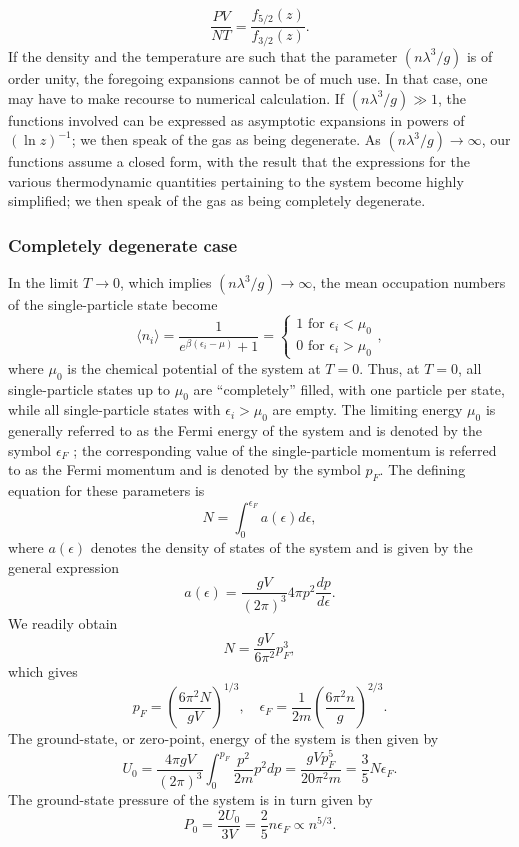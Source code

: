 \[\frac{PV}{NT} = \frac{f_{5/2}(z)}{f_{3/2}(z)}.\]
If the density and the temperature are such that the parameter $(n\lambda^3/g)$ is of order unity, the foregoing expansions cannot be of much use. In that case, one may have to make recourse to numerical calculation.
If $(n\lambda^3/g) \gg 1$, the functions involved can be expressed as asymptotic expansions in powers of $(\ln z)^{-1}$; we then speak of the gas as being degenerate.
As $(n\lambda^3/g) \to \infty$, our functions assume a closed form, with the result that the expressions for the various thermodynamic quantities pertaining to the system become highly simplified; we then speak of the gas as being completely degenerate.

\subsubsection{Completely degenerate case}
In the limit $T \to 0$, which implies $(n\lambda^3/g) \to \infty$, the mean occupation numbers of the single-particle state become
\[\langle n_i \rangle = \frac{1}{e^{\beta(\epsilon_i - \mu)} + 1} = \begin{cases}1 \mbox{ for } \epsilon_i < \mu_0 \\   0 \mbox{ for } \epsilon_i > \mu_0 \end{cases},\]
where $\mu_0$ is the chemical potential of the system at $T = 0$.
Thus, at $T = 0$, all single-particle states up to $\mu_0$ are ``completely'' filled, with one particle per state, while all single-particle states with $\epsilon_i > \mu_0$ are empty. 
The limiting energy $\mu_0$ is generally referred to as the Fermi energy of the system and is denoted by the symbol $\epsilon_F$ ; the corresponding value of the single-particle momentum is referred to as the Fermi momentum and is denoted by the symbol $p_F$. The defining equation for these parameters is
\[N = \int_0^{\epsilon_F} a(\epsilon)d\epsilon,\]
where $a(\epsilon)$ denotes the density of states of the system and is given by the general expression
\[a(\epsilon) = \frac{gV}{(2\pi)^3} 4\pi p^2 \frac{dp}{d\epsilon}.\]
We readily obtain
\[N = \frac{gV}{6\pi^2} p_F^3,\]
which gives
\[p_F = \left( \frac{6\pi^2N}{gV} \right)^{1/3} , \quad \epsilon_F = \frac{1}{2m}\left( \frac{6\pi^2n}{g} \right)^{2/3}.\]
The ground-state, or zero-point, energy of the system is then given by
\[U_0 = \frac{4\pi gV}{(2\pi)^3} \int_0^{p_F} \frac{p^2}{2m} p^2 dp = \frac{gVp_F^5}{20\pi^2m} = \frac{3}{5}N\epsilon_F.\]
The ground-state pressure of the system is in turn given by
\[P_0 = \frac{2U_0}{3V} = \frac{2}{5}n\epsilon_F \propto n^{5/3}.\]

